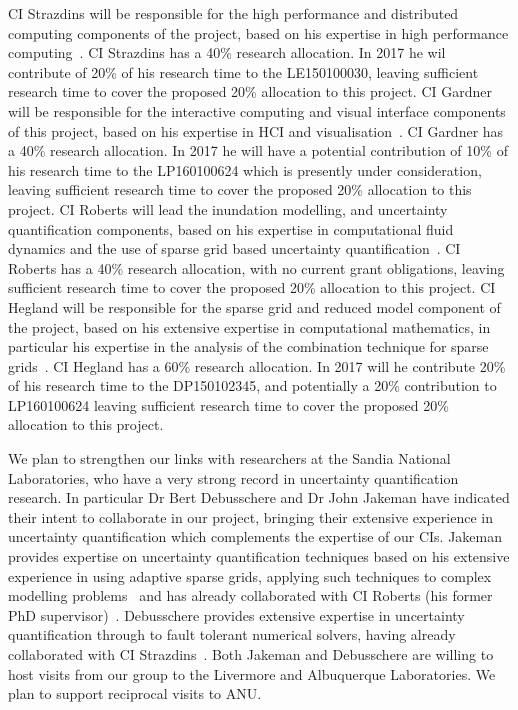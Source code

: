 CI Strazdins will be
responsible for the high performance and distributed computing
components of the project, based on his expertise in high performance
computing~\parencite{AliEtal2015,StrazdinsEtal2015,Ali11022016}.  
CI Strazdins has a 40\% research allocation. In 2017 he wil contribute of 20\%
 of his research time to the LE150100030, leaving sufficient research 
 time to cover the proposed 20\% allocation to this project. 
%
CI Gardner will be responsible for the interactive computing and visual interface components of this project, based on
his expertise in HCI and visualisation~\parencite{martin2016intelligent,martin2015tracking,swift2014coding,swift2013visual,sorensen2010programming,swiftLive2016}.  CI Gardner has a 40\% research allocation. In 2017 he will have a potential contribution of 10\% of his research time to the LP160100624 which is presently under consideration, leaving sufficient research time to cover the proposed 20\% allocation to this project. 
%
CI Roberts will lead the inundation modelling, and
uncertainty quantification components, based on his expertise in
computational fluid dynamics and the use of sparse grid based
uncertainty quantification~\parencite{deBaarRDM2015,JakemanRoberts2013,anugamanual,nielsen2005hydrodynamic}.  
CI Roberts has a 40\% research allocation, with no current grant obligations,  
leaving sufficient research time to cover the proposed 20\% allocation to this project. 
%
CI Hegland will be responsible for the
sparse grid and reduced model component of the project, based on his
extensive expertise in computational mathematics, in particular his
expertise in the analysis of the combination technique for sparse
grids~\parencite{AliEtal2015,HardingHLS2015,Ali11022016}. 
CI Hegland has a 60\% research allocation. In 2017 will he contribute 
20\% of his research time to the DP150102345, and potentially a  20\% 
contribution to LP160100624 leaving sufficient research time 
to cover the proposed 20\% allocation to this project. 

We plan to strengthen our links with researchers at the Sandia National Laboratories, who have
a very strong record in uncertainty quantification research. In particular Dr Bert Debusschere and 
Dr John Jakeman have indicated their intent to collaborate in our project, bringing their
extensive experience in uncertainty quantification which complements the expertise of our CIs.  
Jakeman provides expertise on uncertainty
quantification techniques based on his extensive experience in using adaptive sparse grids,
applying such techniques to complex modelling 
problems~\parencite{JakemanRoberts2013,jakemanNumerical2010,Jakeman2015} and 
has already collaborated with CI Roberts (his former PhD supervisor)~\parencite{JakemanRoberts2013}.
Debusschere provides extensive expertise in uncertainty
quantification through to fault tolerant numerical solvers, having already 
collaborated with CI Strazdins~\parencite{parSGCT16}.
Both Jakeman and Debusschere are willing to host visits from our group to the Livermore and 
Albuquerque Laboratories. We plan to support reciprocal visits to ANU. 


